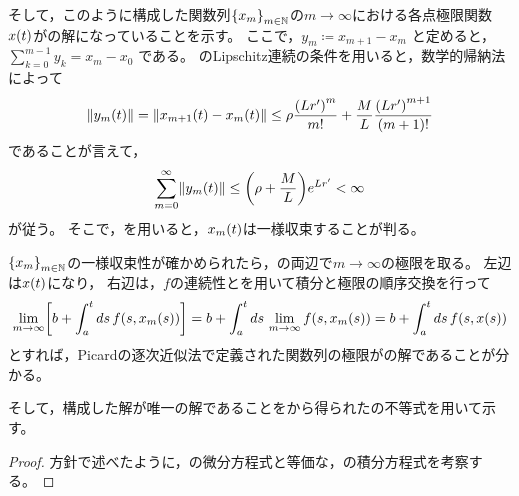 \documentclass[b5paper,draft,oneside,openany]{ltjsbook} %
\begin{document}
\begin{thm}[Picardの定理]
\begin{policy}
        そして，このように構成した関数列$\seq{x_m}{m\in\N}$の$m\to\infty$における各点極限関数$\fun{x}{t}$がの解になっていることを示す。
        ここで，$y_{m}\coloneqq x_{m+1} - x_{m}$
        と定めると，
        $\sum_{k=0}^{m-1} y_k = x_m - x_0$
        である。
        のLipschitz連続の条件を用いると，数学的帰納法によって
        \begin{equation}
            \norm{\fun{y_{m}}{t}}=\norm{\fun{x_{m+1}}{t}-\fun{x_{m}}{t}}\leq \rho\frac{\pare{Lr'}^{m}}{m!}+\frac{M}{L}\frac{\pare{Lr'}^{m+1}}{\pare{m+1}!}
        \end{equation}
        であることが言えて，
        \begin{equation}
            \sum_{m=0}^\infty\norm{\fun{y_m}{t}}\leq \pare{\rho+\frac{M}{L}}e^{Lr'}<\infty
        \end{equation}
        が従う。
        そこで，を用いると，$\fun{x_m}{t}$は一様収束することが判る。

        $\seq{x_m}{m\in\N}$の一様収束性が確かめられたら，の両辺で$m\to\infty$の極限を取る。
        左辺は$\fun{x}{t}$になり，
        右辺は，$f$の連続性とを用いて積分と極限の順序交換を行って
        \begin{equation}
            \lim_{m\to\infty}\squ{b + \int_a^t ds\, \fun{f}{s,\fun{x_{m}}{s}}}
            =b + \int_a^t ds\, \lim_{m\to\infty}\fun{f}{s,\fun{x_{m}}{s}}
            =b + \int_a^t ds\, \fun{f}{s,\fun{x}{s}}
        \end{equation}
        とすれば，Picardの逐次近似法で定義された関数列の極限がの解であることが分かる。

        そして，構成した解が唯一の解であることをから得られたの不等式を用いて示す。
    \end{policy}
    \begin{proof}
        方針で述べたように，の微分方程式と等価な，の積分方程式を考察する。


\end{proof}
\end{thm}
\end{document}
